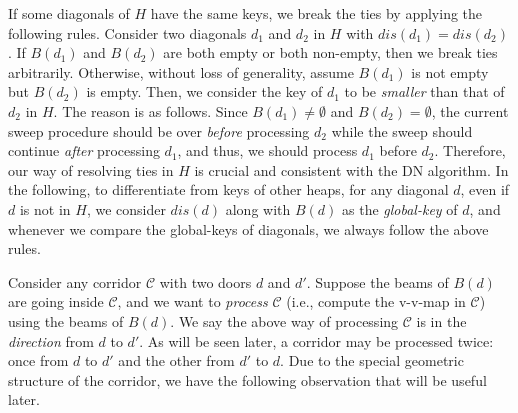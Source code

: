 \documentclass[english,runningheads,11pt]{llncs-revised}
\def\calC{\mathcal{C}}
\begin{document}
If some diagonals of $H$ have the same
keys, we break the ties by applying the following rules. Consider
two diagonals $d_1$ and $d_2$ in $H$ with $dis(d_1)=dis(d_2)$. If
$B(d_1)$ and $B(d_2)$ are both empty or both non-empty, then we break ties
arbitrarily. Otherwise, without loss of generality, assume $B(d_1)$ is
not empty but $B(d_2)$ is empty. Then, we consider the key of $d_1$ to be {\em smaller}
than that of $d_2$ in $H$.
The reason is as follows. Since $B(d_1)\neq \emptyset$ and $B(d_2)=\emptyset$,
the current sweep procedure should be over {\em before}
processing $d_2$ while the sweep
should continue {\em after} processing $d_1$, and thus, we
should process $d_1$ before $d_2$.  Therefore,
our way of resolving ties in $H$ is crucial and consistent with the DN algorithm.
In the following, to differentiate from keys of other heaps, for any diagonal $d$, even if $d$ is not in $H$, we consider $dis(d)$ along with $B(d)$ as the {\em global-key} of $d$, and whenever we compare the global-keys of diagonals, we always follow the above rules.


Consider any corridor $\calC$ with two doors $d$ and $d'$. Suppose
the beams of $B(d)$ are going inside $\calC$, and we want to
{\em process} $\calC$ (i.e., compute the v-v-map in $\calC$) using the beams of $B(d)$.
We say the above way of processing $\calC$ is in the {\em direction} from
$d$ to $d'$. As will be seen later,
a corridor may be processed twice: once
from $d$ to $d'$ and the other from $d'$ to $d$. Due
to the special geometric structure of the corridor, we have the
following observation that will be useful later.
\end{document}
